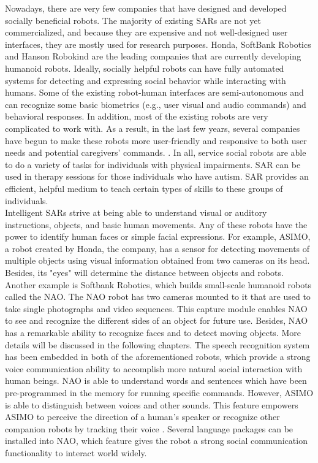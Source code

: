 Nowadays, there are very few companies that have designed and developed socially beneficial 
robots. The majority of existing SARs are not yet commercialized, and because they are expensive 
and not well-designed user interfaces, they are mostly used for research purposes. Honda, SoftBank 
Robotics and Hanson Robokind are the leading companies that are currently developing humanoid robots. 
Ideally, socially helpful robots can have fully automated systems for detecting and expressing 
social behavior while interacting with humans. Some of the existing robot-human interfaces 
are semi-autonomous and can recognize some basic biometrics (e.g., user visual and audio 
commands) and behavioral responses. In addition, most of the existing robots are very complicated 
to work with. As a result, in the last few years, several companies have begun to make these robots 
more user-friendly and responsive to both user needs and potential caregivers' commands. \cite{feil2005defining}.
In all, service social robots are able to do a variety of tasks for individuals with physical impairments. 
SAR can be used in therapy sessions for those individuals who have autism. SAR provides an 
efficient, helpful medium to teach certain types of skills to these groups of individuals.\\

Intelligent SARs strive at being able to understand visual or auditory instructions, objects, 
and basic human movements. Any of these robots have the power to identify human faces or simple 
facial expressions. For example, ASIMO, a robot created by Honda, the company, has a sensor for detecting 
movements of multiple objects using visual information obtained from two cameras on its head.
Besides, its "eyes" will determine the distance between objects and robots. \cite{ASIMO2011}
Another example is Softbank Robotics, which builds small-scale humanoid robots called the NAO. 
The NAO robot has two cameras mounted to it that are used to take single photographs and video 
sequences. This capture module enables NAO to see and recognize the different sides of an object 
for future use. Besides, NAO has a remarkable ability to recognize faces and to detect moving 
objects. More details will be discussed in the following chapters. The speech recognition system
has been embedded in both of the aforementioned robots, which provide a strong voice communication
ability to accomplish more natural social interaction with human beings. NAO is able to understand
words and sentences which have been pre-programmed in the memory for running specific commands. 
However, ASIMO is able to distinguish between voices and other sounds. This feature empowers
ASIMO to perceive the direction of a human’s speaker or recognize other companion robots
by tracking their voice \cite{DSMIV2000}. Several language packages can be installed into
NAO, which feature gives the robot a strong social communication functionality to interact
world widely. \\

